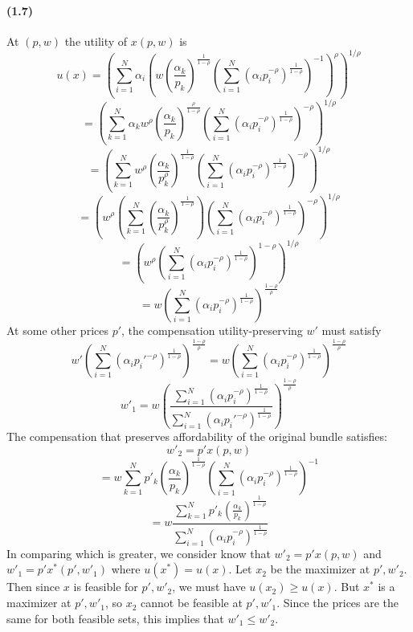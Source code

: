 \documentclass[10pt,letter]{article}
\begin{document}
\paragraph{(1.7)}
At $(p,w)$ the utility of $x(p,w)$ is
\[ u(x) = \left( \sum_{i=1}^N \alpha_i \left(w \left(\frac{\alpha_k}{p_k}\right)^{\frac{1}{1-\rho}}\left(\sum_{i=1}^N \left(\alpha_i p_i^{-\rho }\right)^{\frac{1}{1-\rho}} \right)^{-1}\right)^\rho \right)^{1/\rho} \]
\[ = \left( \sum_{k=1}^N \alpha_kw^\rho \left(\frac{\alpha_k}{p_k}\right)^{\frac{\rho}{1-\rho}}\left(\sum_{i=1}^N \left(\alpha_i p_i^{-\rho }\right)^{\frac{1}{1-\rho}} \right)^{-\rho} \right)^{1/\rho} \]
\[ = \left( \sum_{k=1}^N w^\rho \left(\frac{\alpha_k}{p_k^\rho}\right)^{\frac{1}{1-\rho}}\left(\sum_{i=1}^N \left(\alpha_i p_i^{-\rho }\right)^{\frac{1}{1-\rho}} \right)^{-\rho} \right)^{1/\rho} \]
\[ = \left( w^\rho \left( \sum_{k=1}^N  \left(\frac{\alpha_k}{p_k^\rho}\right)^{\frac{1}{1-\rho}} \right)\left(\sum_{i=1}^N \left(\alpha_i p_i^{-\rho }\right)^{\frac{1}{1-\rho}} \right)^{-\rho} \right)^{1/\rho} \]
\[ = \left( w^\rho \left(\sum_{i=1}^N \left(\alpha_i p_i^{-\rho }\right)^{\frac{1}{1-\rho}} \right)^{1-\rho} \right)^{1/\rho} \]
\[ = w \left( \sum_{i=1}^N \left(\alpha_i p_i^{-\rho }\right)^{\frac{1}{1-\rho}} \right)^{\frac{1-\rho}{\rho}}  \]
At some other prices $p'$, the compensation utility-preserving $w'$ must satisfy
\[ w' \left( \sum_{i=1}^N \left(\alpha_i p_i'^{-\rho }\right)^{\frac{1}{1-\rho}} \right)^{\frac{1-\rho}{\rho}} = w \left( \sum_{i=1}^N \left(\alpha_i p_i^{-\rho }\right)^{\frac{1}{1-\rho}} \right)^{\frac{1-\rho}{\rho}} \]
\[ w'_1 = w \left( \frac{\sum_{i=1}^N \left(\alpha_i p_i^{-\rho }\right)^{\frac{1}{1-\rho}}}{\sum_{i=1}^N \left(\alpha_i p_i'^{-\rho }\right)^{\frac{1}{1-\rho}}} \right)^{\frac{1-\rho}{\rho}} \]
The compensation that preserves affordability of the original bundle satisfies:
\[ w'_2 = p' x(p,w) \]
\[  = w \sum_{k=1}^N p'_k \left(\frac{\alpha_k}{p_k}\right)^{\frac{1}{1-\rho}}\left(\sum_{i=1}^N \left(\alpha_i p_i^{-\rho }\right)^{\frac{1}{1-\rho}} \right)^{-1} \]
\[  = w \frac{\sum_{k=1}^N p'_k \left(\frac{\alpha_k}{p_k}\right)^{\frac{1}{1-\rho}}}{\sum_{i=1}^N \left(\alpha_i p_i^{-\rho }\right)^{\frac{1}{1-\rho}} } \]
In comparing which is greater, we consider know that $w'_2 = p'x(p,w)$ and $w'_1 = p'x^*(p',w'_1)$ where $u(x^*) = u(x)$. Let $x_2$ be the maximizer at $p', w'_2$. Then since $x$ is feasible for $p', w'_2$, we must have $u(x_2) \ge u(x)$. But $x^*$ is a maximizer at $p', w'_1$, so $x_2$ cannot be feasible at $p', w'_1$. Since the prices are the same for both feasible sets, this implies that $w'_1 \le w'_2$.
\end{document}
